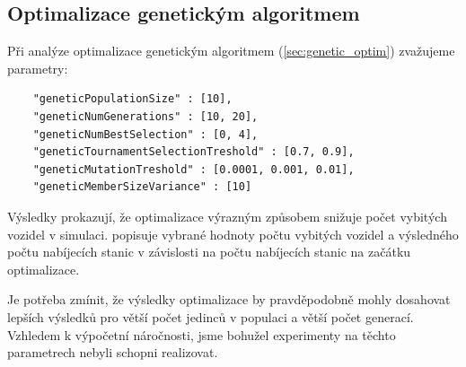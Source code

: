 \subsection{Optimalizace genetickým algoritmem}
Při analýze optimalizace genetickým algoritmem (\cref{sec:genetic_optim})
zvažujeme parametry:

\begin{verbatim}
    "geneticPopulationSize" : [10],
    "geneticNumGenerations" : [10, 20],
    "geneticNumBestSelection" : [0, 4],
    "geneticTournamentSelectionTreshold" : [0.7, 0.9],
    "geneticMutationTreshold" : [0.0001, 0.001, 0.01],
    "geneticMemberSizeVariance" : [10]
\end{verbatim}

Výsledky prokazují, že optimalizace výrazným způsobem snižuje počet vybitých
vozidel v simulaci.  popisuje vybrané hodnoty počtu
vybitých vozidel a výsledného počtu nabíjecích stanic v závislosti na počtu 
nabíjecích stanic na začátku optimalizace.

Je potřeba zmínit, že výsledky optimalizace by pravděpodobně mohly dosahovat
lepších výsledků pro větší počet jedinců v populaci a větší počet generací.
Vzhledem k výpočetní náročnosti, jsme bohužel experimenty na těchto parametrech 
nebyli schopni realizovat.



